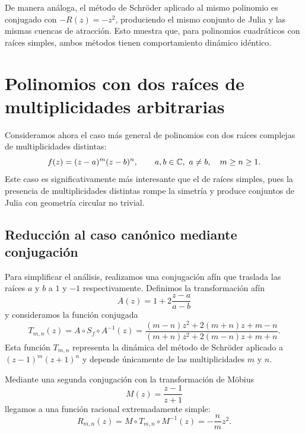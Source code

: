 De manera análoga, el método de Schröder aplicado al mismo polinomio es conjugado con $-R(z)=-z^2$, produciendo el mismo conjunto de Julia y las mismas cuencas de atracción. Esto muestra que, para polinomios cuadráticos con raíces simples, ambos métodos tienen comportamiento dinámico idéntico.

\section{Polinomios con dos raíces de multiplicidades arbitrarias}

Consideramos ahora el caso más general de polinomios con dos raíces complejas de multiplicidades distintas:
\begin{equation}
 f(z)=(z-a)^m(z-b)^n,\qquad a,b\in\mathbb{C},\ a\ne b,\quad m\ge n\ge 1.
 \label{eq:poly_dos_raices}
\end{equation}
Este caso es significativamente más interesante que el de raíces simples, pues la presencia de multiplicidades distintas rompe la simetría y produce conjuntos de Julia con geometría circular no trivial.

\subsection{Reducción al caso canónico mediante conjugación}

Para simplificar el análisis, realizamos una conjugación afín que traslada las raíces $a$ y $b$ a $1$ y $-1$ respectivamente. Definimos la transformación afín
\begin{equation}
A(z)=1+2\frac{z-a}{a-b}
\label{eq:afin}
\end{equation}
y consideramos la función conjugada
\begin{equation}
T_{m,n}(z)=A\circ S_f\circ A^{-1}(z)=\frac{(m-n) z^2 +2 (m+n) z +m-n}{(m+n) z^2 +2(m-n)z +m+n}.
\label{eq:Tmn}
\end{equation}
Esta función $T_{m,n}$ representa la dinámica del método de Schröder aplicado a $(z-1)^m(z+1)^n$ y depende únicamente de las multiplicidades $m$ y $n$.

Mediante una segunda conjugación con la transformación de Möbius
\begin{equation}
M(z)=\frac{z-1}{z+1}
\label{eq:Mobius}
\end{equation}
llegamos a una función racional extremadamente simple:
\begin{equation}
R_{m,n}(z)=M\circ T_{m,n}\circ M^{-1}(z)=-\frac{n}{m}z^2.
\label{eq:Rmn}
\end{equation}

